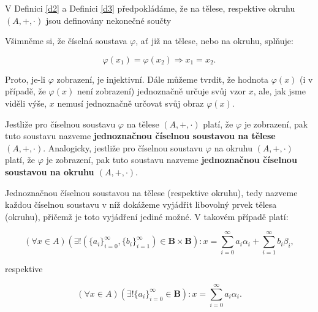 \documentclass[czech,bachelor,dept470,male]{diploma}
\newcommand{\posla}{\{a_i\}_{i=0}^{\infty}}
\newcommand{\poslb}{\{b_i\}_{i=1}^{\infty}}
\begin{document}
\begin{remark}
	V Definici \ref{d2} a Definici \ref{d3} předpokládáme, že na tělese, respektive okruhu $(A,+,\cdot)$ jsou definovány nekonečné součty
\end{remark}

\begin{remark}
	Všimněme si, že číselná soustava $\varphi$, ať již na tělese, nebo na okruhu, splňuje:
	
	$$\varphi (x_1) = \varphi(x_2) \Rightarrow x_1 = x_2.$$
	
	Proto, je-li $\varphi$ zobrazení, je injektivní.
	Dále můžeme tvrdit, že hodnota $\varphi(x)$ (i v případě, že $\varphi(x)$ není zobrazení) jednoznačně určuje svůj vzor $x$, ale, jak jsme viděli výše, $x$ nemusí jednoznačně určovat svůj obraz $\varphi(x)$.
	
\end{remark}

\begin{definition}
	Jestliže pro číselnou soustavu $\varphi$ na tělese $(A,+,\cdot)$ platí, že $\varphi$ je zobrazení, pak tuto soustavu nazveme \textbf{jednoznačnou číselnou soustavou na tělese $(A,+,\cdot)$}. Analogicky, jestliže pro číselnou soustavu $\varphi$ na okruhu $(A,+,\cdot)$ platí, že $\varphi$ je zobrazení, pak tuto soustavu nazveme \textbf{jednoznačnou číselnou soustavou na okruhu $(A,+,\cdot)$}.
\end{definition}

Jednoznačnou číselnou soustavou na tělese (respektive okruhu), tedy nazveme každou číselnou soustavu v níž dokážeme vyjádřit libovolný prvek tělesa (okruhu), přičemž je toto vyjádření jediné možné. V takovém případě platí:	

$$(\forall x \in A) (\exists!(\posla,\poslb)\in\textbf{B}\times\textbf{B}): x = \sum_{i=0}^{\infty} a_{i}\alpha_{i} + \sum_{i=1}^{\infty} b_{i}\beta_{i},$$

respektive

$$(\forall x \in A) (\exists! \posla \in \textbf{B}): x = \sum_{i=0}^{\infty} a_{i}\alpha_{i}.$$
\end{document}
